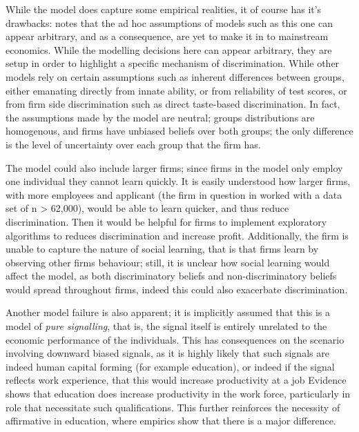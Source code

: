 \documentclass[]{article}
\begin{document}

While the model does capture some empirical realities, it of course has it's drawbacks: \citet{Farmer2025} notes that the ad hoc assumptions of models such as this one can appear arbitrary, and as a consequence, are yet to make it in to mainstream economics. While the modelling decisions here can appear arbitrary, they are setup in order to highlight a specific mechanism of discrimination. While other models rely on certain assumptions such as inherent differences between groups, either emanating directly from innate ability, or from reliability of test scores, or from firm side discrimination such as direct taste-based discrimination. In fact, the assumptions made by the model are neutral; groups distributions are homogenous, and firms have unbiased beliefs over both groups; the only difference is the level of uncertainty over each group that the firm has. 

The model could also include larger firms; since firms in the model only employ one individual they cannot learn quickly. It is easily understood how larger firms, with more employees and applicant (the firm in question in \citet{LiRaymondBergman2020} worked with a data set of n > 62,000), would be able to learn quicker, and thus reduce discrimination. Then it would be helpful for firms to implement exploratory algorithms to reduces discrimination and increase profit. Additionally, the firm is unable to capture the nature of social learning, that is that firms learn by observing other firms behaviour; still, it is unclear how social learning would affect the model, as both discriminatory beliefs and non-discriminatory beliefs would spread throughout firms, indeed this could also exacerbate discrimination.

Another model failure is also apparent; it is implicitly assumed that this is a model of \textit{pure signalling}, that is, the signal itself is entirely unrelated to the economic performance of the individuals. This has consequences on the scenario involving downward biased signals, as it is highly likely that such signals are indeed human capital forming (for example education), or indeed if the signal reflects work experience, that this would increase productivity at a job Evidence shows that education does increase productivity in the work force, particularly in role that necessitate such qualifications. This further reinforces the necessity of affirmative in education, where empirics show that there is a major difference.
\end{document}
